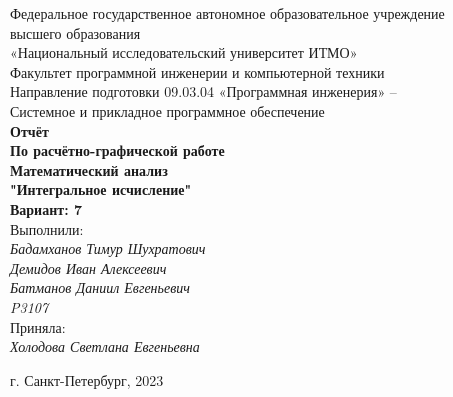 \documentclass[main.tex]{subfiles}
\begin{document}
\pagestyle{empty}
\begin{center}

\large
Федеральное государственное автономное образовательное учреждение  \\
высшего образования \\
«Национальный исследовательский университет ИТМО» \\
Факультет программной инженерии и компьютерной техники \\
Направление подготовки 09.03.04 «Программная инженерия» – \\
Системное и прикладное программное обеспечение \\
\vspace{5cm}
\textbf{Отчёт} \\
\vspace{0mm}
\textbf{По расчётно-графической работе} \\
\textbf{Математический анализ} \\
\textbf{"Интегральное исчисление"} \\
\textbf{Вариант: 7} \\
\vspace{3cm}
\leftskip=9cm
Выполнили: \\
\textit{Бадамханов Тимур Шухратович \\ Демидов Иван Алексеевич \\ Батманов Даниил Евгеньевич \\ P3107 \\}
\vspace{1cm}
Приняла: \\
\textit{Холодова Светлана Евгеньевна} \\
\vfill
\begin{center}
г. Санкт-Петербург, 2023 \\
\end{center}
\end{center}
\end{document}
